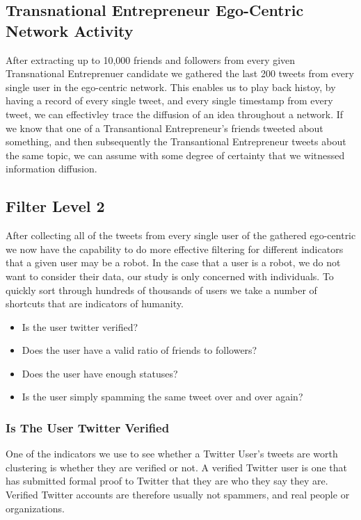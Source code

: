 \subsection{Transnational Entrepreneur Ego-Centric Network Activity}
After extracting up to 10,000 friends and followers from every given Transnational Entreprenuer candidate we gathered the last 200 tweets from every single user in the ego-centric network. This enables us to play back histoy, by having a record of every single tweet, and every single timestamp from every tweet, we can effectivley trace the diffusion of an idea throughout a network. If we know that one of a Transantional Entrepreneur's friends tweeted about something, and then subsequently the Transantional Entrepreneur tweets about the same topic, we can assume with some degree of certainty that we witnessed information diffusion.

\subsection{Filter Level 2}
After collecting all of the tweets from every single user of the gathered ego-centric we now have the capability to do more effective filtering for different indicators that a given user may be a robot. In the case that a user is a robot, we do not want to consider their data, our study is only concerned with individuals. To quickly sort through hundreds of thousands of users we take a number of shortcuts that are indicators of humanity.

\begin{itemize}
\item Is the user twitter verified?
\item Does the user have a valid ratio of friends to followers?
\item Does the user have enough statuses?
\item Is the user simply spamming the same tweet over and over again?
\end{itemize}

\subsubsection{Is The User Twitter Verified}
One of the indicators we use to see whether a Twitter User's tweets are worth clustering is whether they are verified or not. A verified Twitter user is one that has submitted formal proof to Twitter that they are who they say they are. Verified Twitter accounts are therefore usually not spammers, and real people or organizations.

